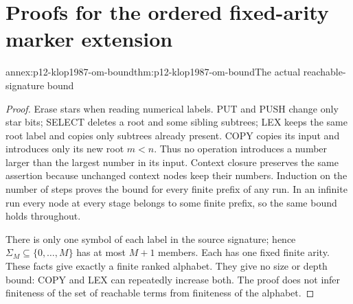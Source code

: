 \section{Proofs for the ordered fixed-arity marker extension}

\begin{annexitem}{annex:p12-klop1987-om-bound}{thm:p12-klop1987-om-bound}{The actual reachable-signature bound}
\begin{proof}
Erase stars when reading numerical labels. PUT and PUSH change only
star bits; SELECT deletes a root and some sibling subtrees; LEX keeps
the same root label and copies only subtrees already present. COPY
copies its input and introduces only its new root \(m<n\). Thus no
operation introduces a number larger than the largest number in its
input. Context closure preserves the same assertion because unchanged
context nodes keep their numbers. Induction on the number of steps
proves the bound for every finite prefix of any run. In an infinite
run every node at every stage belongs to some finite prefix, so the
same bound holds throughout.

There is only one symbol of each label in the source signature; hence
\(\Sigma_M\subseteq\{0,\ldots,M\}\) has at most \(M+1\)
members. Each has one fixed finite arity. These facts give exactly a
finite ranked alphabet. They give no size or depth bound: COPY and
LEX can repeatedly increase both. The proof does not infer finiteness
of the set of reachable terms from finiteness of the alphabet.
\end{proof}
\end{annexitem}


